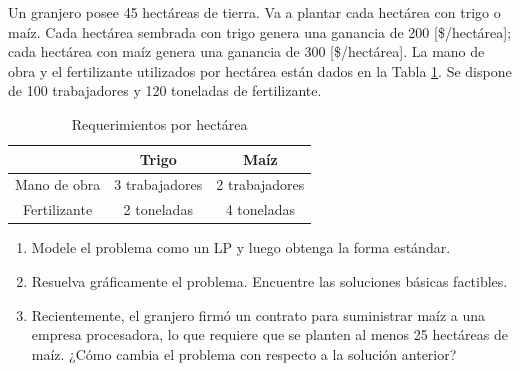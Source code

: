 Un granjero posee 45 hectáreas de tierra. Va a plantar cada hectárea con trigo o maíz. Cada hectárea sembrada con trigo genera una ganancia de 200 [\$/hectárea]; cada hectárea con maíz genera una ganancia de 300 [\$/hectárea]. La mano de obra y el fertilizante utilizados por hectárea están dados en la Tabla \ref{ex:3:3:requerimientos}. Se dispone de 100 trabajadores y 120 toneladas de fertilizante.

\begin{table}[h!]
\centering
\begin{tabular}{|c|c|c|}
\hline
\textbf{} & \textbf{Trigo} & \textbf{Maíz} \\
\hline
Mano de obra & 3 trabajadores & 2 trabajadores \\
\hline
Fertilizante & 2 toneladas & 4 toneladas \\
\hline
\end{tabular}
\caption{Requerimientos por hectárea}
\label{ex:3:3:requerimientos}
\end{table}

\begin{enumerate}
    \item[a)] Modele el problema como un LP y luego obtenga la forma estándar.
    \item[b)] Resuelva gráficamente el problema. Encuentre las soluciones básicas factibles.
    \item[c)] Recientemente, el granjero firmó un contrato para suministrar maíz a una empresa procesadora, lo que requiere que se planten al menos 25 hectáreas de maíz. ¿Cómo cambia el problema con respecto a la solución anterior?
\end{enumerate}

